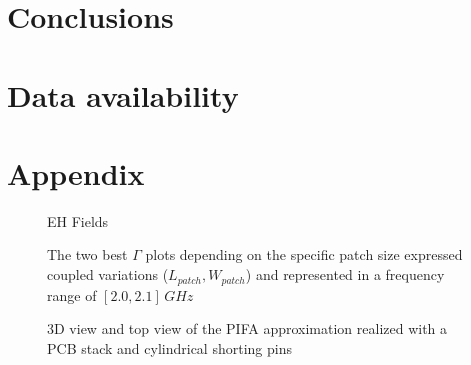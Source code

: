 \documentclass[10pt,a4paper,twocolumn]{article}
\begin{document}
{\section*{Conclusions}

\section*{Data availability}

		\printbibliography

\pagebreak
\appendix
\section*{Appendix}
	\begin{figure}[b!]
			\begin{subfigure}{0.48\linewidth}
			\caption{}
		\end{subfigure}
		\hfill
		\begin{subfigure}{0.48\linewidth}
			\caption{}
		\end{subfigure}
		\caption{EH Fields}
		\label{}
		\begin{subfigure}{0.48\linewidth}
			\def\svgwidth{\linewidth}
			\tiny{}
						\caption{}
		\end{subfigure}
	\hfill
		\begin{subfigure}{0.48\linewidth}
			\def\svgwidth{\linewidth}
			\tiny{}
			\caption{}
		\end{subfigure}
		\caption{The two best $\Gamma$ plots depending on the specific patch size expressed coupled variations ($L_{patch},W_{patch}$) and represented in a frequency range of $[2.0,2.1]\,GHz$}
		\label{fig:Gamma couple LpWp}
		\begin{subfigure}{0.45\linewidth}
			\def\svgwidth{\linewidth}
			\tiny{}
		\end{subfigure}
	\hfill
		\begin{subfigure}{0.45\linewidth}
			\def\svgwidth{\linewidth}
			\tiny{}
		\end{subfigure}
		\caption{3D view and top view of the PIFA approximation realized with a PCB stack and cylindrical shorting pins}
		\label{fig:pcb shorting}
	\end{figure}

}
\end{document}
